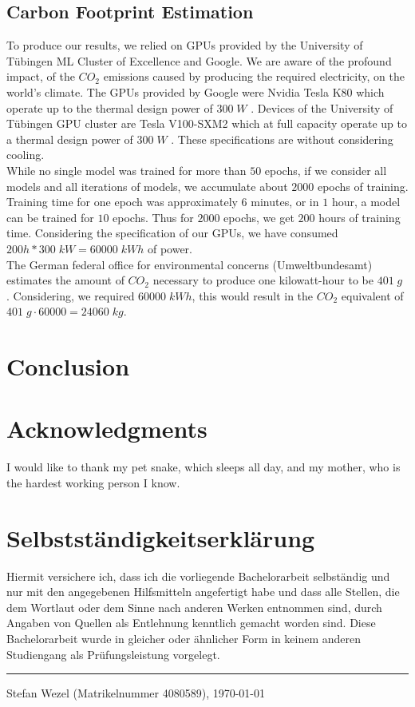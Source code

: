 \documentclass[a4paper,cleardoubleempty,BCOR1cm, 11pt]{report}
\begin{document}
\section{Carbon Footprint Estimation}
To produce our results, we relied on GPUs provided by the University of Tübingen ML Cluster of Excellence and Google. We are aware of the profound impact, of the $CO_2$ emissions caused by producing the required electricity, on the world's climate.
The GPUs provided by Google were Nvidia Tesla K80 which operate up to the thermal design power of $300\;W$ \cite{nvidia2015tesla}. Devices of the University of Tübingen GPU cluster are Tesla V100-SXM2 which at full capacity operate up to a thermal design power of $300\;W$ \cite{nvidia2017tesla}. These specifications are without considering cooling.\\
While no single model was trained for more than $50$ epochs, if we consider all models and all iterations of models, we accumulate about $2000$ epochs of training. Training time for one epoch was approximately $6$ minutes, or in $1$ hour, a model can be trained for $10$ epochs. Thus for $2000$ epochs, we get $200$ hours of training time. Considering the specification of our GPUs, we have consumed $200h * 300\;kW = 60000\;kWh$ of power.\\
The German federal office for environmental concerns (Umweltbundesamt) estimates the amount of $CO_2$ necessary to produce one kilowatt-hour to be $401\;g$ \cite{icha2016entwicklung}. Considering, we required $60000\;kWh$, this would result in the $CO_2$ equivalent of $401\;g \cdot 60000 = 24060\;kg$.




\chapter{Conclusion}








\chapter*{Acknowledgments}
I would like to thank my pet snake, which sleeps all day, and my mother, who is the hardest working person I know.



\chapter*{Selbstst\"andigkeitserkl\"arung}
Hiermit versichere ich, dass ich die vorliegende Bachelorarbeit selbst\"andig und
nur mit den angegebenen Hilfsmitteln angefertigt habe und dass alle Stellen,
die dem Wortlaut oder dem Sinne nach anderen Werken entnommen sind,
durch Angaben von Quellen als Entlehnung kenntlich gemacht worden sind.
Diese Bachelorarbeit wurde in gleicher oder \"ahnlicher Form in keinem anderen
Studiengang als Pr\"ufungsleistung vorgelegt.

\vspace*{8ex}
\hrule
\vspace*{2ex}
Stefan Wezel (Matrikelnummer 4080589), \today
\end{document}
